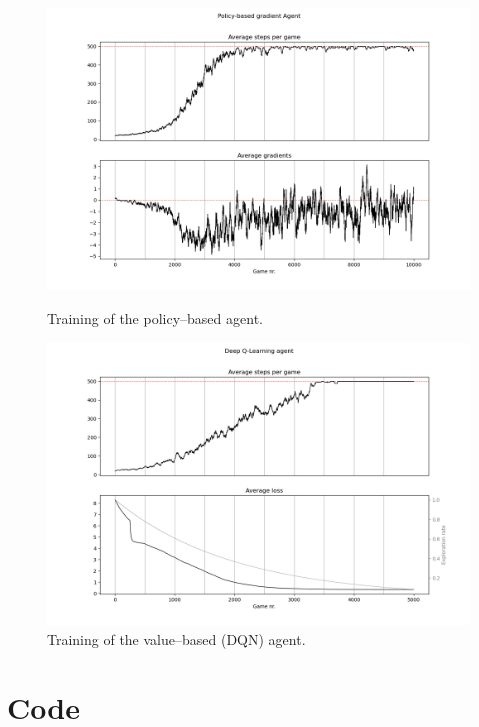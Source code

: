 \documentclass{article}
\begin{document}
\begin{figure}[h]
    \centering
    \begin{minipage}{0.5\textwidth}
        \centering
        \includegraphics[width=\linewidth]{images/torch-pbg.png}
        \caption{Training of the policy–based agent.}
        \label{fig:policy-based-metrics}
    \end{minipage}\hfill
    \begin{minipage}{0.5\textwidth}
        \centering
        \includegraphics[width=\linewidth]{images/torch-dqn.png}
        \caption{Training of the value–based (DQN) agent.}
        \label{fig:value-based-metrics}
    \end{minipage}
\end{figure}

\newpage
\hypertarget{sec:code}{}
\section*{Code}
\end{document}
